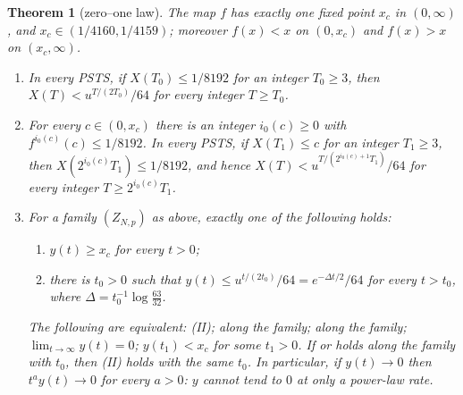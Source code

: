 \documentclass[11pt,a4paper]{amsart}
\newtheorem{theorem}{Theorem}[section]
\theoremstyle{definition}
\theoremstyle{remark}
\numberwithin{equation}{section}
\newcommand{\PSTS}{\textup{PSTS}}          %
\newcommand{\xconst}{\frac{1}{8192}}       %
\newcommand{\xconstinl}{1/8192}            %
\newcommand{\Mcirc}{\text{\upshape(M$^{\circ}$)}}   %
\newcommand{\Bcirc}{\text{\upshape(B$^{\circ}$)}}   %
\newcommand{\tzero}{t_0}                   %
\begin{document}
\begin{theorem}[zero--one law]\label{thm:zero-one}
The map $f$ has exactly one fixed point $x_c$ in $(0,\infty)$, and $x_c\in(1/4160,1/4159)$; moreover $f(x)<x$ on $(0,x_c)$ and $f(x)>x$ on $(x_c,\infty)$.
\begin{enumerate}[label=(\alph*)]
\item In every \PSTS{}, if $X(T_0)\le\xconstinl$ for an integer $T_0\ge3$, then $X(T)<u^{T/(2T_0)}/64$ for every integer $T\ge T_0$.
\item For every $c\in(0,x_c)$ there is an integer $i_0(c)\ge0$ with $f^{i_0(c)}(c)\le\xconstinl$. In every \PSTS{}, if $X(T_1)\le c$ for an integer $T_1\ge3$, then $X(2^{i_0(c)}T_1)\le\xconstinl$, and hence $X(T)<u^{T/(2^{i_0(c)+1}T_1)}/64$ for every integer $T\ge2^{i_0(c)}T_1$.
\item For a family $(Z_{N,p})$ as above, exactly one of the following holds:
\begin{enumerate}[label=(\Roman*)]
\item $y(t)\ge x_c$ for every $t>0$;
\item there is $\tzero>0$ such that $y(t)\le u^{t/(2t_0)}/64=e^{-\Delta t/2}/64$ for every $t>\tzero$, where $\Delta=\tzero^{-1}\log\frac{63}{32}$.
\end{enumerate}
The following are equivalent: \textup{(II)}; \Mcirc{} along the family; \Bcirc{} along the family; $\lim_{t\to\infty}y(t)=0$; $y(t_1)<x_c$ for some $t_1>0$. If \Mcirc{} or \Bcirc{} holds along the family with $\tzero$, then \textup{(II)} holds with the same $\tzero$. In particular, if $y(t)\to0$ then $t^ay(t)\to0$ for every $a>0$: $y$ cannot tend to $0$ at only a power-law rate.
\end{enumerate}
\end{theorem}
\end{document}
